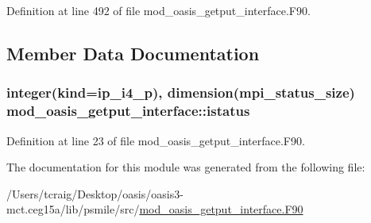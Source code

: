 Definition at line 492 of file mod\+\_\+oasis\+\_\+getput\+\_\+interface.\+F90.



\subsection{Member Data Documentation}
\hypertarget{classmod__oasis__getput__interface_a2ceaaa5740216799f651b8dacb42b239}{
\subsubsection[{istatus}]{\setlength{\rightskip}{0pt plus 5cm}integer(kind=ip\+\_\+i4\+\_\+p), dimension(mpi\+\_\+status\+\_\+size) mod\+\_\+oasis\+\_\+getput\+\_\+interface\+::istatus\hspace{0.3cm}{\ttfamily [private]}}}\label{classmod__oasis__getput__interface_a2ceaaa5740216799f651b8dacb42b239}


Definition at line 23 of file mod\+\_\+oasis\+\_\+getput\+\_\+interface.\+F90.



The documentation for this module was generated from the following file\+:\begin{DoxyCompactItemize}
\item 
/\+Users/tcraig/\+Desktop/oasis/oasis3-\/mct.\+ceg15a/lib/psmile/src/\hyperlink{mod__oasis__getput__interface_8_f90}{mod\+\_\+oasis\+\_\+getput\+\_\+interface.\+F90}\end{DoxyCompactItemize}
